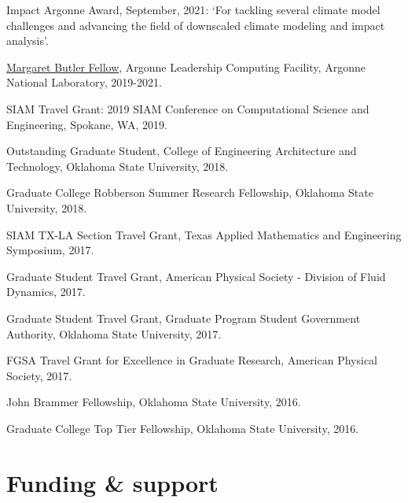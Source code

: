 \documentclass[letterpaper]{article}
\renewenvironment{itemize}{
  \begin{list}{}{
    \setlength{\leftmargin}{1.5em}
  }
}{
  \end{list}
}
\begin{document}
\begin{itemize}

\item Impact Argonne Award, September, 2021: `For tackling several climate model challenges and advancing the field of downscaled climate modeling and impact analysis'.

\item \href{https://www.alcf.anl.gov/margaret-butler-fellowship-computational-science}{Margaret Butler Fellow}, Argonne Leadership Computing Facility, Argonne National Laboratory, 2019-2021.

\item SIAM Travel Grant: 2019 SIAM Conference on Computational Science and Engineering, Spokane, WA, 2019.

\item Outstanding Graduate Student, College of Engineering Architecture and Technology, Oklahoma State University, 2018.

\item Graduate College Robberson Summer Research Fellowship, Oklahoma State University, 2018.

\item SIAM TX-LA Section Travel Grant, Texas Applied Mathematics and Engineering Symposium, 2017.

\item Graduate Student Travel Grant, American Physical Society - Division of Fluid Dynamics, 2017.

\item Graduate Student Travel Grant, Graduate Program Student Government Authority, Oklahoma State University, 2017.

\item FGSA Travel Grant for Excellence in Graduate Research, American Physical Society, 2017.

\item John Brammer Fellowship, Oklahoma State University, 2016.

\item Graduate College Top Tier Fellowship, Oklahoma State University, 2016.

\end{itemize}

\section*{Funding \& support}
\end{document}
